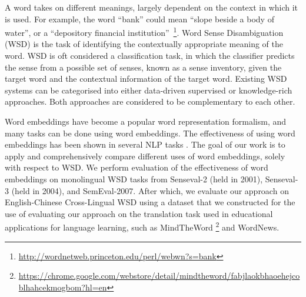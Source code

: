 A word takes on different meanings, largely dependent on the context
in which it is used. For example, the word ``bank'' could mean ``slope
beside a body of water'', or a ``depository financial
institution''~\footnote{\url{http://wordnetweb.princeton.edu/perl/webwn?s=bank}}. Word
Sense Disambiguation (WSD) is the task of identifying the contextually
appropriate meaning of the word. WSD is oft considered a
classification task, in which the classifier predicts the sense from a
possible set of senses, known as a sense inventory, given the target
word and the contextual information of the target word. Existing WSD
systems can be categorised into either data-driven supervised or
knowledge-rich approaches. Both approaches are considered to be
complementary to each other.

Word embeddings have become a popular word representation formalism,
and many tasks can be done using word embeddings. The effectiveness of
using word embeddings has been shown in
several NLP tasks \cite{Turian10wordrepresentations}. The goal of our
work is to apply and comprehensively compare different uses of word
embeddings, solely with respect to WSD. We perform evaluation of the
effectiveness of word embeddings on monolingual WSD tasks from
Senseval-2 (held in 2001), Senseval-3 (held in 2004), and
SemEval-2007. After which, we evaluate our approach on English-Chinese
Cross-Lingual WSD using a dataset that we constructed for the use of
evaluating our approach on the translation task used in educational
applications for language learning, such as MindTheWord
{\footnote{\url{https://chrome.google.com/webstore/detail/mindtheword/fabjlaokbhaoehejcoblhahcekmogbom?hl=en}}}
and WordNews.


